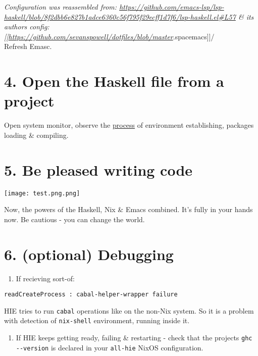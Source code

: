 \documentclass[a4paper,14pt,oneside]{book}
\begin{document}
\emph{Configuration was reassembled from: \url{https://github.com/emacs-lsp/lsp-haskell/blob/8f2dbb6e827b1adce6360c56f795f29ecff1d7f6/lsp-haskell.el\#L57} \& its authors config: [[\url{https://github.com/sevanspowell/dotfiles/blob/master}}.spacemacs]]/\\

Refresh Emasc.\\

\section{4. Open the Haskell file from a project}
\label{sec:org9dca6d8}

Open system monitor, observe the \hyperref[orge7f5556]{process} of environment establishing, packages loading \& compiling.\\

\section{5. Be pleased writing code}
\label{sec:org344b3cc}

\begin{center}
\texttt{[image: test.png.png]}
\end{center}

Now, the powers of the Haskell, Nix \& Emacs combined. It's fully in your hands now. Be cautious - you can change the world.\\

\section{6. (optional) Debugging}
\label{sec:orgcfb5778}

\begin{enumerate}
\item If recieving sort-of:\\
\end{enumerate}

\begin{verbatim}
readCreateProcess : cabal-helper-wrapper failure
\end{verbatim}

HIE tries to run \texttt{cabal} operations like on the non-Nix system. So it is a problem with detection of \texttt{nix-shell} environment, running inside it.\\

\begin{enumerate}
\item If HIE keeps getting ready, failing \& restarting - check that the projects \texttt{ghc -{}-version} is declared in your \texttt{all-hie} NixOS configuration.\\
\end{enumerate}
\end{document}
